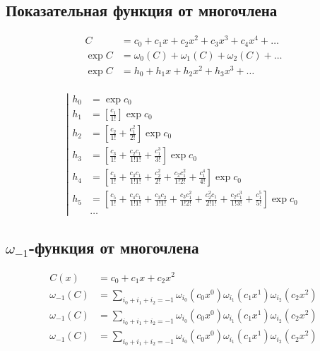 \subsection{Показательная функция от многочлена}

\begin{equation*}
\begin{aligned}
C &= c_0 + c_1 x + c_2 x^2 + c_3 x^3 + c_4 x^4 + \ldots \\
\exp{C} &= \omega_{0}(C) + \omega_{1}(C) + \omega_{2}(C) + \ldots \\
\exp{C} &= h_0 + h_1 x + h_2 x^2 + h_3 x^3 + \ldots \\
\end{aligned}
\end{equation*}

\begin{equation*}
\left|
\begin{aligned}
h_0 &= \exp{c_0}
\\
h_1 
&= \left[\frac{c_1}{1!} \right] \exp{c_0}
\\ 
h_2 
&= \left[\frac{c_2}{1!} 
+ \frac{c_1^2}{2!} \right] \exp{c_0}
\\
h_3 
&= \left[\frac{c_3}{1!} 
+ \frac{c_2 c_1}{1!1!} 
+ \frac{c_1^3}{3!} \right] \exp{c_0}
\\
h_4 
&= \left[\frac{c_4}{1!} 
+ \frac{c_3 c_1}{1!1!} 
+ \frac{c_2^2}{2!} 
+ \frac{c_2 c_1^2}{1!2!} 
+ \frac{c_1^4}{4!} \right] \exp{c_0}
\\
h_5
&= \left[\frac{c_5}{1!}
+ \frac{c_4 c_1}{1!1!}
+ \frac{c_3 c_2}{1!1!}
+ \frac{c_3 c_1^2}{1!2!}
+ \frac{c_2^2 c_1}{2!1!}
+ \frac{c_2 c_1^3}{1!3!}
+ \frac{c_1^5}{5!} \right] \exp{c_0}
\\
&\ldots
\end{aligned}
\right.
\end{equation*}

\subsection{$\omega_{-1}$-функция от многочлена}

\begin{equation*}\begin{aligned}
C(x) &= c_0 + c_1 x + c_2 x^2
\\
\omega_{-1}(C) &= \sum_{i_0 + i_1 + i_2 = -1}
{
  \omega_{i_0}(c_0 x^0)
  \omega_{i_1}(c_1 x^1)
  \omega_{i_2}(c_2 x^2)
} \\
\omega_{-1}(C) &= \sum_{i_0 + i_1 + i_2 = -1}
{
  \omega_{i_0}(c_0 x^0)
  \omega_{i_1}(c_1 x^1)
  \omega_{i_2}(c_2 x^2)
} \\
\omega_{-1}(C) &= \sum_{i_0 + i_1 + i_2 = -1}
{
  \omega_{i_0}(c_0 x^0)
  \omega_{i_1}(c_1 x^1)
  \omega_{i_2}(c_2 x^2)
} \\
\end{aligned}\end{equation*}

